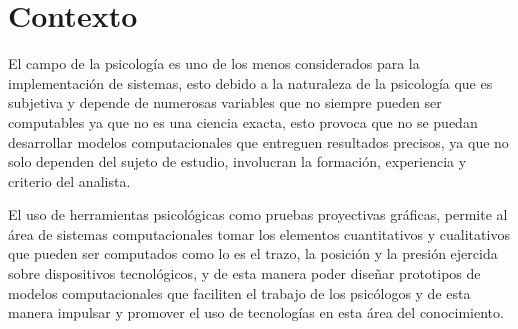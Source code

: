 \section{Contexto}

El campo de la psicología es uno de los menos considerados para la implementación de sistemas, esto debido a la naturaleza de la psicología que es subjetiva y depende de numerosas variables que no siempre pueden ser computables ya que no es una ciencia exacta, esto provoca que no se puedan desarrollar modelos computacionales que entreguen resultados precisos, ya que no solo dependen del sujeto de estudio, involucran la formación, experiencia y criterio del analista.

El uso de herramientas psicológicas como pruebas proyectivas gráficas, permite al área de sistemas computacionales tomar los elementos cuantitativos y cualitativos que pueden ser computados como lo es el trazo, la posición y la presión ejercida sobre dispositivos tecnológicos, y de esta manera poder diseñar prototipos de modelos computacionales que faciliten el trabajo de los psicólogos y de esta manera impulsar y promover el uso de tecnologías en esta área del conocimiento.